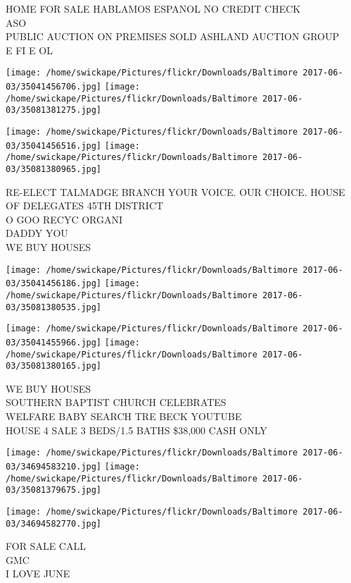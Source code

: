\documentclass[10pt,letterpaper]{article}
\begin{document}
HOME FOR SALE HABLAMOS ESPANOL NO CREDIT CHECK\\
ASO\\
PUBLIC AUCTION ON PREMISES SOLD ASHLAND AUCTION GROUP\\
E FI E OL\\
\pagebreak

\texttt{[image: /home/swickape/Pictures/flickr/Downloads/Baltimore 2017-06-03/35041456706.jpg]}
\texttt{[image: /home/swickape/Pictures/flickr/Downloads/Baltimore 2017-06-03/35081381275.jpg]}

\texttt{[image: /home/swickape/Pictures/flickr/Downloads/Baltimore 2017-06-03/35041456516.jpg]}
\texttt{[image: /home/swickape/Pictures/flickr/Downloads/Baltimore 2017-06-03/35081380965.jpg]}

RE{-}ELECT TALMADGE BRANCH YOUR VOICE.  OUR CHOICE.  HOUSE OF DELEGATES 45TH DISTRICT\\
O GOO RECYC ORGANI\\
DADDY YOU\\
WE BUY HOUSES\\
\pagebreak

\texttt{[image: /home/swickape/Pictures/flickr/Downloads/Baltimore 2017-06-03/35041456186.jpg]}
\texttt{[image: /home/swickape/Pictures/flickr/Downloads/Baltimore 2017-06-03/35081380535.jpg]}

\texttt{[image: /home/swickape/Pictures/flickr/Downloads/Baltimore 2017-06-03/35041455966.jpg]}
\texttt{[image: /home/swickape/Pictures/flickr/Downloads/Baltimore 2017-06-03/35081380165.jpg]}

WE BUY HOUSES\\
SOUTHERN BAPTIST CHURCH CELEBRATES\\
WELFARE BABY SEARCH TRE BECK YOUTUBE\\
HOUSE 4 SALE 3 BEDS/1.5 BATHS \$38,000 CASH ONLY\\
\pagebreak

\texttt{[image: /home/swickape/Pictures/flickr/Downloads/Baltimore 2017-06-03/34694583210.jpg]}
\texttt{[image: /home/swickape/Pictures/flickr/Downloads/Baltimore 2017-06-03/35081379675.jpg]}

\vspace{0.25in}
\texttt{[image: /home/swickape/Pictures/flickr/Downloads/Baltimore 2017-06-03/34694582770.jpg]}

FOR SALE CALL\\
GMC\\
I LOVE JUNE\\
\pagebreak
\end{document}
